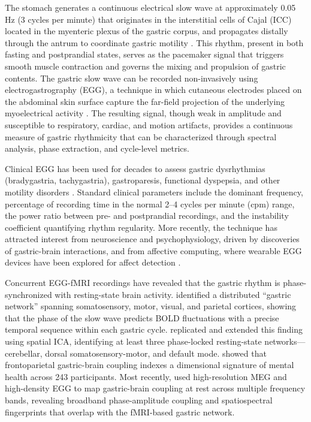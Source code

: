 \documentclass[12pt]{article}
\begin{document}
The stomach generates a continuous electrical slow wave at approximately 0.05
Hz (3 cycles per minute) that originates in the interstitial cells of Cajal
(ICC) located in the myenteric plexus of the gastric corpus, and propagates
distally through the antrum to coordinate gastric motility
\citep{Koch2004, ChenMcCallum1991}. This rhythm, present in both
fasting and postprandial states, serves as the pacemaker signal that triggers
smooth muscle contraction and governs the mixing and propulsion of gastric
contents. The gastric slow wave can be recorded non-invasively using
electrogastrography (EGG), a technique in which cutaneous electrodes placed on
the abdominal skin surface capture the far-field projection of the underlying
myoelectrical activity \citep{Chang2005, Yin2013}. The resulting signal,
though weak in amplitude and susceptible to respiratory, cardiac, and motion
artifacts, provides a continuous measure of gastric rhythmicity that can be
characterized through spectral analysis, phase extraction, and cycle-level
metrics.

Clinical EGG has been used for decades to assess gastric dysrhythmias
(bradygastria, tachygastria), gastroparesis, functional dyspepsia, and other
motility disorders \citep{Koch2004}. Standard clinical parameters include the
dominant frequency, percentage of recording time in the normal 2--4 cycles per
minute (cpm) range, the power ratio between pre- and postprandial recordings,
and the instability coefficient quantifying rhythm regularity. More recently,
the technique has attracted interest from neuroscience and psychophysiology,
driven by discoveries of gastric-brain interactions, and from affective
computing, where wearable EGG devices have been explored for affect detection
\citep{Vujic2020}.

Concurrent EGG-fMRI recordings have revealed that the gastric rhythm is
phase-synchronized with resting-state brain activity. \citet{Rebollo2018}
identified a distributed ``gastric network'' spanning somatosensory, motor,
visual, and parietal cortices, showing that the phase of the slow wave
predicts BOLD fluctuations with a precise temporal sequence within each
gastric cycle. \citet{Choe2021} replicated and extended this finding using
spatial ICA, identifying at least three phase-locked resting-state
networks---cerebellar, dorsal somatosensory-motor, and default mode.
\citet{Banellis2025} showed that frontoparietal gastric-brain coupling indexes
a dimensional signature of mental health across 243 participants. Most
recently, \citet{Berther2026} used high-resolution MEG and high-density EGG to
map gastric-brain coupling at rest across multiple frequency bands, revealing
broadband phase-amplitude coupling and spatiospectral fingerprints that
overlap with the fMRI-based gastric network.
\end{document}
